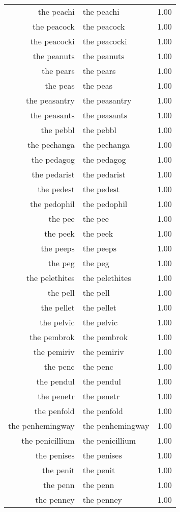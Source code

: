 \begin{table}[ht]
\begin{tabular}{rlr}
  the peachi & the peachi & 1.00 \\ 
  the peacock & the peacock & 1.00 \\ 
  the peacocki & the peacocki & 1.00 \\ 
  the peanuts & the peanuts & 1.00 \\ 
  the pears & the pears & 1.00 \\ 
  the peas & the peas & 1.00 \\ 
  the peasantry & the peasantry & 1.00 \\ 
  the peasants & the peasants & 1.00 \\ 
  the pebbl & the pebbl & 1.00 \\ 
  the pechanga & the pechanga & 1.00 \\ 
  the pedagog & the pedagog & 1.00 \\ 
  the pedarist & the pedarist & 1.00 \\ 
  the pedest & the pedest & 1.00 \\ 
  the pedophil & the pedophil & 1.00 \\ 
  the pee & the pee & 1.00 \\ 
  the peek & the peek & 1.00 \\ 
  the peeps & the peeps & 1.00 \\ 
  the peg & the peg & 1.00 \\ 
  the pelethites & the pelethites & 1.00 \\ 
  the pell & the pell & 1.00 \\ 
  the pellet & the pellet & 1.00 \\ 
  the pelvic & the pelvic & 1.00 \\ 
  the pembrok & the pembrok & 1.00 \\ 
  the pemiriv & the pemiriv & 1.00 \\ 
  the penc & the penc & 1.00 \\ 
  the pendul & the pendul & 1.00 \\ 
  the penetr & the penetr & 1.00 \\ 
  the penfold & the penfold & 1.00 \\ 
  the penhemingway & the penhemingway & 1.00 \\ 
  the penicillium & the penicillium & 1.00 \\ 
  the penises & the penises & 1.00 \\ 
  the penit & the penit & 1.00 \\ 
  the penn & the penn & 1.00 \\ 
  the penney & the penney & 1.00 \\ 

\end{tabular}
\end{table}
